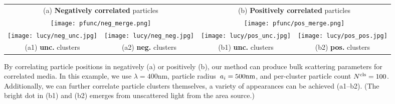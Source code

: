 \begin{figure}
    \centering
    \setlength{\resLen}{0.8in}
    \addtolength{\tabcolsep}{-3.5pt}
    \small
    \begin{tabular}{cc|cc}
        \multicolumn{2}{c|}{(a) \textbf{Negatively correlated} particles} &
        \multicolumn{2}{c}{(b) \textbf{Positively correlated} particles}
        \\
        \multicolumn{2}{c|}{\texttt{[image: pfunc/neg\_merge.png]}} & \multicolumn{2}{c}{\texttt{[image: pfunc/pos\_merge.png]}} 
        \\
        \texttt{[image: lucy/neg\_unc.jpg]} &
        \texttt{[image: lucy/neg\_neg.jpg]} &
        \texttt{[image: lucy/pos\_unc.jpg]} &
        \texttt{[image: lucy/pos\_pos.jpg]} 
        \\
        (a1) \textbf{unc.} clusters & (a2) \textbf{neg.} clusters & (b1) \textbf{unc.} clusters & (b2) \textbf{pos.} clusters
    \end{tabular}
    \caption{\label{fig:correlated}
        By correlating particle positions in negatively (a) or positively (b), our method can produce bulk scattering parameters for correlated media.
        In this example, we use $\lambda = 400\text{nm}$, particle radius~$a_i = 500\text{nm}$, and per-cluster particle count ${N^\text{cls}} = 100$.
        Additionally, we can further correlate particle clusters themselves, a variety of appearances can be achieved (a1--b2).
        (The bright dot in (b1) and (b2) emerges from unscattered light from the area source.)
    }
\end{figure}

